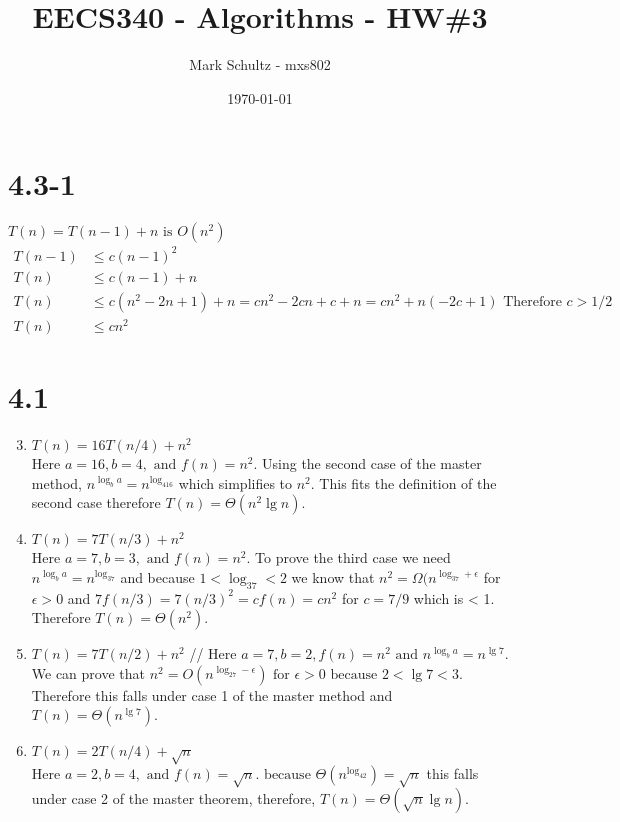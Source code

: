 \documentclass[11pt]{article}
\newcommand{\comment}[1]{}
\begin{document}
\title{EECS340 - Algorithms - HW\#3}
\date{\today}
\author{Mark Schultz - mxs802}
\maketitle
\vspace{2in}

\section*{4.3-1}
\comment{\begin{enumerate}
\item 
\item 

\end{enumerate}
}
$T(n)=T(n-1)+n \text{ is } O(n^2)$ \\
\begin{align*}
T(n-1) &\leq c(n-1)^2 \\
T(n) &\leq c(n-1) +n \\
T(n) &\leq c(n^2-2n+1)+n = cn^2-2cn+c+n = cn^2+n(-2c+1) \text{ Therefore }c>1/2\\
T(n) &\leq cn^2
\end{align*}

\section*{4.1}
\begin{enumerate}
\setcounter{enumi}{2}
\item $T(n)=16T(n/4)+n^2$ \\ Here $a=16, b=4,\text{ and }f(n)=n^2$. Using the second case of the master method, $n^{\log_ba}=n^{\log_416}$ which simplifies to $n^2$. This fits the definition of the second case therefore $T(n)=\Theta (n^2\lg n)$.
\item $T(n)=7T(n/3)+n^2$ \\ Here $a=7, b=3, \text{ and }f(n)=n^2$. To prove the third case we need $n^{\log_ba}=n^{\log_37}$ and because $1<\log_37<2$ we know that $n^2=\Omega(n^{\log_37+\epsilon}$ for $\epsilon >0$ and $7f(n/3)=7(n/3)^2=cf(n)=cn^2$ for $c=7/9$ which is < 1. Therefore $T(n)=\Theta(n^2)$.
\item $T(n)=7T(n/2)+n^2$ // Here $a=7, b=2, f(n)=n^2\text{ and }n^{\log_ba}=n^{\lg 7}$. We can prove that $n^2=O(n^{\log_27-\epsilon})\text{ for }\epsilon>0\text{ because }2<\lg 7<3$. Therefore this falls under case 1 of the master method and $T(n)=\Theta(n^{\lg 7})$.
\item $T(n)=2T(n/4)+\sqrt{n}$ \\ Here $a=2, b=4, \text{ and }f(n)=\sqrt{n} \text{. because }\Theta(n^{\log_42})=\sqrt{n}$ this falls under case 2 of the master theorem, therefore, $T(n)=\Theta(\sqrt{n}\lg n)$.

\end{enumerate}
\end{document}
